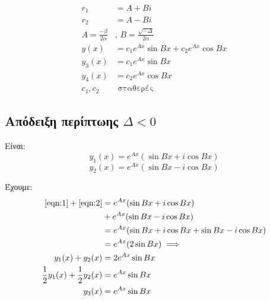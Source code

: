 \documentclass[12pt]{extarticle}
\begin{document}
\begin{enumerate}
          \begin{equation*}
              \begin{aligned}
                  r_1                      & = A + Bi                                    \\
                  r_2                      & = A - Bi                                    \\
                  A        = \frac{-β}{2α} & \text{, } B = \frac{\sqrt{-Δ}}{2α}          \\
                  y(x)                     & = c_1 e^{Ax} \sin{Bx} + c_2 e^{Ax} \cos{Bx} \\
                  y_3(x)                   & = c_1 e^{Ax} \sin{Bx}                       \\
                  y_4(x)                   & = c_2 e^{Ax} \cos{Bx}                       \\
                  c_1, c_2                 & \text{ σταθερές}
              \end{aligned}
          \end{equation*}
\end{enumerate}
\subsection{Απόδειξη περίπτωης \(Δ<0\)}
Είναι:
\begin{equation}\label{eqn:1}
    y_1(x) = e^{Ax} (\sin{Bx} + i \cos{Bx})
\end{equation}
\begin{equation}\label{eqn:2}
    y_2(x) = e^{Ax} (\sin{Bx} - i \cos{Bx})
\end{equation}

Έχουμε:
\begin{equation*}
    \begin{aligned}
        \eqref{eqn:1} + \eqref{eqn:2}           & = e^{Ax} (\sin{Bx} + i \cos{Bx})                         \\
                                                & + e^{Ax} (\sin{Bx} - i \cos{Bx})                         \\
                                                & = e^{Ax} (\sin{Bx} + i \cos{Bx} + \sin{Bx} - i \cos{Bx}) \\
                                                & = e^{Ax} (2 \sin{Bx}) \implies                           \\
        y_1(x) + y_2(x)                         & = 2 e^{Ax} \sin{Bx}                                      \\
        \frac{1}{2} y_1(x) + \frac{1}{2} y_2(x) & = e^{Ax} \sin{Bx}                                        \\
        y_3(x)                                  & = e^{Ax} \sin{Bx}
    \end{aligned}
\end{equation*}
\end{document}
